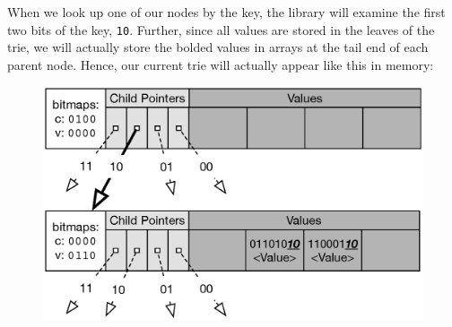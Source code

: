 \documentclass[preprint]{sigplanconf}
\begin{document}
When we look up one of our nodes by the key, the library will examine the first two bits of the key, \texttt{10}.
Further, since all values are stored in the leaves of the trie, we will actually store the bolded values in arrays at the tail end of each parent node. Hence, our current trie will actually appear like this in memory:
\begin{figure}[H]
\includegraphics[scale=.47]{trie2actual}
\centering
\end{figure}
\end{document}

